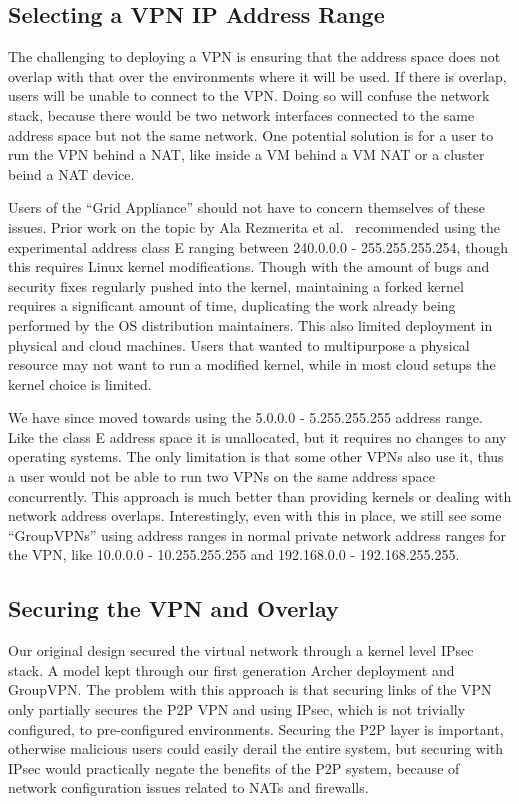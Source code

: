 \documentclass[conference]{IEEEtran}
\begin{document}
\subsection{Selecting a VPN IP Address Range}

The challenging to deploying a VPN is ensuring that the address space does not
overlap with that over the environments where it will be used.  If there is
overlap, users will be unable to connect to the VPN.  Doing so will confuse the
network stack, because there would be two network interfaces connected to the
same address space but not the same network.  One potential solution is for a
user to run the VPN behind a NAT, like inside a VM behind a VM NAT or a
cluster beind a NAT device.

Users of the ``Grid Appliance'' should not have to concern themselves of these
issues.  Prior work on the topic by Ala Rezmerita et al.~\cite{pvc} recommended
using the experimental address class E ranging between 240.0.0.0 -
255.255.255.254, though this requires Linux kernel modifications.  Though with
the amount of bugs and security fixes regularly pushed into the kernel,
maintaining a forked kernel requires a significant amount of time, duplicating
the work already being performed by the OS distribution maintainers.  This also
limited deployment in physical and cloud machines.  Users that wanted to
multipurpose a physical resource may not want to run a modified kernel, while
in most cloud setups the kernel choice is limited.

We have since moved towards using the 5.0.0.0 - 5.255.255.255 address range.
Like the class E address space it is unallocated, but it requires no changes to
any operating systems.  The only limitation is that some other VPNs also use
it, thus a user would not be able to run two VPNs on the same address space
concurrently.  This approach is much better than providing kernels or dealing
with network address overlaps.  Interestingly, even with this in place, we
still see some ``GroupVPNs''  using address ranges in normal private network
address ranges for the VPN, like 10.0.0.0 - 10.255.255.255 and 192.168.0.0 -
192.168.255.255.

\subsection{Securing the VPN and Overlay}

Our original design secured the virtual network through a kernel level IPsec
stack.  A model kept through our first generation Archer deployment and
GroupVPN.  The problem with this approach is that securing links of the VPN
only partially secures the P2P VPN and using IPsec, which is not trivially
configured, to pre-configured environments.  Securing the P2P layer is
important, otherwise malicious users could easily derail the entire system, but
securing with IPsec would practically negate the benefits of the P2P system,
because of network configuration issues related to NATs and firewalls.
\end{document}
